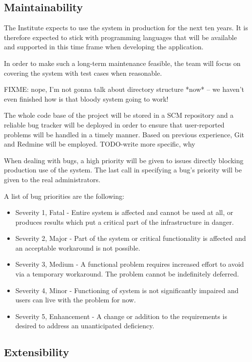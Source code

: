 \documentclass[12pt]{article}
\begin{document}
\subsection{Maintainability}

The Institute expects to use the system in production for the next ten years.
It is therefore expected to stick with programming languages that will be
available and supported in this time frame when developing the application.

In order to make such a long-term maintenance feasible, the team will focus on
covering the system with test cases when reasonable.

FIXME: nope, I'm not gonna talk about directory structure *now* -- we haven't
even finished how is that bloody system going to work!

The whole code base of the project will be stored in a SCM repository and a
reliable bug tracker will be deployed in order to ensure that user-reported
problems will be handled in a timely manner.  Based on previous experience, Git
and Redmine will be employed. TODO-write more specific, why

When dealing with bugs, a high priority will be given to issues directly
blocking production use of the system.  The last call in specifying a bug's
priority will be given to the real administrators.

A list of bug priorities are the following:
\begin{itemize}
	\item Severity 1, Fatal - Entire system is affected and cannot be used at
        all, or produces results which put a critical part of the infrastructure
        in danger.
	\item Severity 2, Major - Part of the system or critical functionality is affected and an acceptable workaround is not possible.
	\item Severity 3, Medium - A functional problem requires increased effort to avoid via a temporary workaround. The problem cannot be indefinitely deferred.
	\item Severity 4, Minor - Functioning of system is not significantly impaired and users can live with the problem for now.
	\item Severity 5, Enhancement - A change or addition to the requirements is desired to address an unanticipated deficiency.
\end{itemize}


\subsection{Extensibility}
\end{document}
